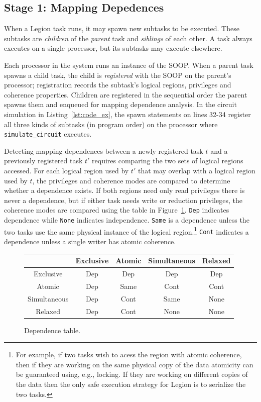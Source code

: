 \subsection{Stage 1: Mapping Depedences}
\label{sec:dep}


When a Legion task runs, it may spawn new subtasks to be executed.  
These subtasks are {\em children} of the {\em parent} task and {\em siblings} of each other.  
A task always executes on a single processor, but
its subtasks may execute elsewhere.

Each processor in the system runs an instance of the SOOP.
When a parent task spawns a child task, the child is {\em registered}
with the SOOP on the parent's processor;
registration records the subtask's logical regions,
privileges and coherence properties.  Children are
registered in the sequential order the parent
spawns them and enqueued for mapping dependence analysis.  In the
circuit simulation in Listing~\ref{lst:code_ex}, the spawn
statements on lines 32-34 register all three
kinds of subtasks (in program order) on the processor where {\tt
simulate\_circuit} executes.

Detecting mapping dependences between a newly registered task $t$ and
a previously registered task $t'$ requires comparing the two sets of
logical regions accessed.  For each logical region used by $t'$ that
may overlap with a logical region used by $t$, the privileges and
coherence modes are compared to determine whether a dependence exists.
If both regions need only read privileges there is never a dependence,
but if either task needs write or reduction privileges, the coherence
modes are compared using the table in Figure~\ref{fig:dependence}.
{\tt Dep} indicates dependence while {\tt None}
indicates independence.  {\tt Same} is a dependence unless the two tasks
use the same physical instance of the logical region.\footnote{For example, if two tasks wish to acess the region with atomic coherence, then if they are working on the same physical copy of the data atomicity can be guaranteed using, e.g., locking.  If they are working on different copies of the data then the only safe execution strategy for Legion is to serialize the two tasks.}
{\tt Cont} 
indicates a dependence unless a single writer has
atomic coherence.  


\begin{figure}
{\small
\begin{tabular}{c|cccc}
             & Exclusive & Atomic   & Simultaneous & Relaxed \\
\midrule
Exclusive    & Dep & Dep & Dep & Dep \\ 
Atomic       & Dep & Same & Cont & Cont \\
Simultaneous & Dep & Cont & Same & None \\
Relaxed      & Dep & Cont & None & None \\
\end{tabular}
}
\caption{Dependence table.}
\label{fig:dependence}
\end{figure}

